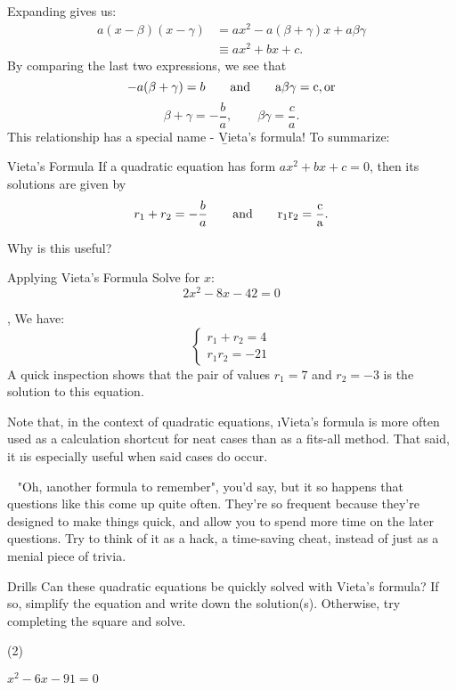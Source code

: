 Expanding gives us:
\begin{align}
    a(x-\beta)(x-\gamma)
    &= ax^2-a(\beta+\gamma)x+a\beta\gamma \\
    &\equiv ax^2+bx+c.
\end{align}
By comparing the last two expressions, we see that
$$-a(\beta+\gamma)=b\qquad\rm{and}\qquad a\beta\gamma=c\rm{, or}$$
$$\beta+\gamma=-\frac{b}{a},\qquad\beta\gamma=\frac{c}{a}.$$
This relationship has a special name - \b{Vieta's formula}! To summarize:
\begin{theorem}{Vieta's Formula}
If a quadratic equation has form $ax^2+bx+c=0$, then its solutions are given by $$r_1+r_2=-\frac{b}{a}\qquad\rm{and}\qquad r_1r_2=\frac{c}{a}.$$
\end{theorem}

Why is this useful? %

\begin{example}{Applying Vieta's Formula}
Solve for $x$: $$2x^2-8x-42=0$$

\sep
We have:
$$\begin{cases}
        r_1+r_2=4 \\
        r_1r_2=-21
    \end{cases}$$
A quick inspection shows that the pair of values $r_1=7$ and $r_2=-3$ is the solution to this equation.
\end{example}
Note that, in the context of quadratic equations, \i{Vieta's formula is more often used as a calculation shortcut for neat cases than as a fits-all method.} That said, it \i{is} especially useful when said cases do occur.
\begin{insight}{~}
"Oh, \i{another} formula to remember", you'd say, but it so happens that questions like this come up quite often. They're so frequent because they're designed to make things quick, and allow you to spend more time on the later questions. Try to think of it as a hack, a time-saving cheat, instead of just as a menial piece of trivia.
\end{insight}

\begin{questions}{Drills}
Can these quadratic equations be quickly solved with Vieta's formula? If so, simplify the equation and write down the solution(s). Otherwise, try completing the square and solve.
\begin{question_set}(2)
    \item $x^2-6x-91=0$
    \item $ $
    \item $ $
    \item $ $
    \item $ $
    \item $ $
\end{question_set}
\end{questions}

